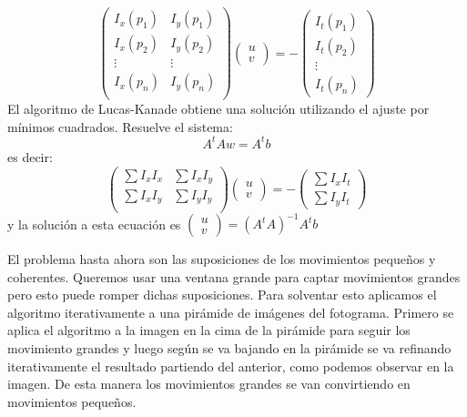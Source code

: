 \documentclass[a4paper,openright, 12pt]{book}
\begin{document}
\begin{equation}
\left(
\begin{matrix}
I_x(p_1) & I_y(p_1)\\
I_x(p_2) & I_y(p_2)\\
\vdots & \vdots \\
I_x(p_n) & I_y(p_n)\\
\end{matrix}
\right)
\left(\begin{array}{c}u\\v\end{array}\right)
=
- \left(\begin{array}{c} I_t(p_1)\\I_t(p_2)\\ \vdots\\ I_t(p_n)\end{array}\right)
\end{equation}
El algoritmo de Lucas-Kanade obtiene una solución utilizando el ajuste por mínimos cuadrados. Resuelve el sistema:
\begin{equation*}
A^t Aw=A^t b
\end{equation*}
es decir:
\begin{equation*}
\left(
\begin{matrix}
\sum I_x I_x & \sum I_x I_y\\
\sum I_x I_y & \sum I_y I_y\\
\end{matrix}
\right)
\left(\begin{array}{c}u\\v\end{array}\right)
=
- \left(\begin{array}{c} \sum I_x I_t\\ \sum I_y I_t\end{array}\right)
\end{equation*}
y la solución a esta ecuación es $\left(\begin{array}{c}u\\v\end{array}\right) = (A^t A)^{-1} A^t b $  

El problema hasta ahora son las suposiciones de los movimientos pequeños y coherentes. Queremos usar una ventana grande para captar movimientos grandes pero esto puede romper dichas suposiciones. Para solventar esto aplicamos el algoritmo iterativamente a una pirámide de imágenes del fotograma. Primero se aplica el algoritmo a la imagen en la cima de la pirámide para seguir los movimiento grandes y luego según se va bajando en la pirámide se va refinando iterativamente el resultado partiendo del anterior, como podemos observar en la imagen. De esta manera los movimientos grandes se van convirtiendo en movimientos pequeños.
\end{document}
